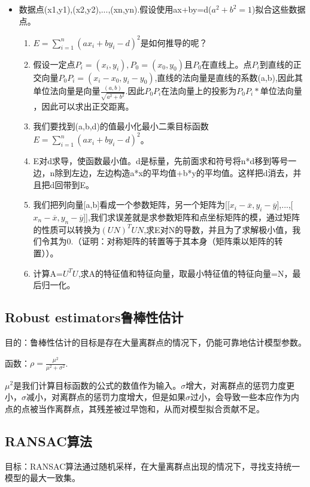 \documentclass[UTF8]{ctexart}
\begin{document}
\begin{itemize}
    \item 数据点(x1,y1),(x2,y2),...,(xn,yn).假设使用ax+by=d($a^2+b^2=1$)拟合这些数据点。
    \begin{enumerate}
        \item $E=\sum_{i=1}^{n}(ax_i+by_i-d)^2$是如何推导的呢？
        \item 假设一定点$P_i=(x_i,y_i),P_0=(x_0,y_0)且P_0在直线上。$点$P_i$到直线的正交向量$P_0P_i=(x_i-x_0,y_i-y_0)$,直线的法向量是直线的系数(a,b),因此其单位法向量是向量$\frac{(a,b)}{\sqrt{a^2+b^2}}$.因此$P_0P_i$在法向量上的投影为$P_0P_i*单位法向量$，因此可以求出正交距离。
        \item 我们要找到(a,b,d)的值最小化最小二乘目标函数$E=\sum_{i=1}^{n}(ax_i+by_i-d)^2$。
        \item E对d求导，使函数最小值。d是标量，先前面求和符号将n*d移到等号一边，n除到左边，左边构造a*x的平均值+b*y的平均值。这样把d消去，并且把d回带到E。
        \item 我们把列向量[a,b]看成一个参数矩阵，另一个矩阵为[[$x_i-\overline{x},y_i-\overline{y}$],...,[$x_n-\overline{x},y_n-\overline{y}$]],我们求误差就是求参数矩阵和点坐标矩阵的模，通过矩阵的性质可以转换为$(UN)^TUN$,求E对N的导数，并且为了求解极小值，我们令其为0.（证明：对称矩阵的转置等于其本身（矩阵乘以矩阵的转置））。
        \item 计算A=$U^TU$,求A的特征值和特征向量，取最小特征值的特征向量=N，最后归一化。
    \end{enumerate}
\end{itemize}

\subsection{Robust estimators鲁棒性估计}

目的：鲁棒性估计的目标是存在大量离群点的情况下，仍能可靠地估计模型参数。

函数：$\rho=\frac{\mu^2}{\mu^2+\sigma^2}$.

$\mu^2$是我们计算目标函数的公式的数值作为输入。$\sigma$增大，对离群点的惩罚力度更小，$\sigma$减小，对离群点的惩罚力度增大，但是如果$\sigma$过小，会导致一些本应作为内点的点被当作离群点，其残差被过早饱和，从而对模型拟合贡献不足。

\subsection{RANSAC算法}

目标：RANSAC算法通过随机采样，在大量离群点出现的情况下，寻找支持统一模型的最大一致集。
\end{document}
